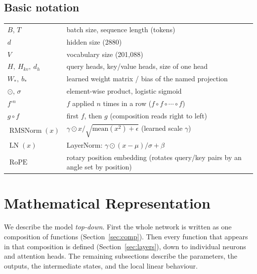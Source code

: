 \documentclass[10pt,a4paper]{article}
\newcommand{\op}[1]{\operatorname{#1}}
\theoremstyle{definition}
\begin{document}
\subsection*{Basic notation}
\begin{tabular}{ll}
\toprule
$B$, $T$ & batch size, sequence length (tokens) \\
$d$ & hidden size (2880) \\
$V$ & vocabulary size (201,088) \\
$H,\ H_{kv},\ d_h$ & query heads, key/value heads, size of one head \\
$W_\ast,\ b_\ast$ & learned weight matrix / bias of the named projection \\
$\odot$, $\sigma$ & element-wise product, logistic sigmoid \\
$f^{\circ n}$ & $f$ applied $n$ times in a row ($f\circ f\circ\cdots\circ f$) \\
$g \circ f$ & first $f$, then $g$ (composition reads right to left) \\
$\op{RMSNorm}(x)$ & $\gamma \odot x / \sqrt{\mathrm{mean}(x^2)+\epsilon}$ (learned scale $\gamma$) \\
$\op{LN}(x)$ & LayerNorm: $\gamma\odot(x-\mu)/\sigma + \beta$ \\
$\op{RoPE}$ & rotary position embedding (rotates query/key pairs by an angle set by position) \\
\bottomrule
\end{tabular}
\section{Mathematical Representation}\label{sec:func}
We describe the model \emph{top-down}. First the whole network is written as one composition of functions (Section~\ref{sec:comp}). Then every function that appears in that composition is defined (Section~\ref{sec:layers}), down to individual neurons and attention heads. The remaining subsections describe the parameters, the outputs, the intermediate states, and the local linear behaviour.
\end{document}
